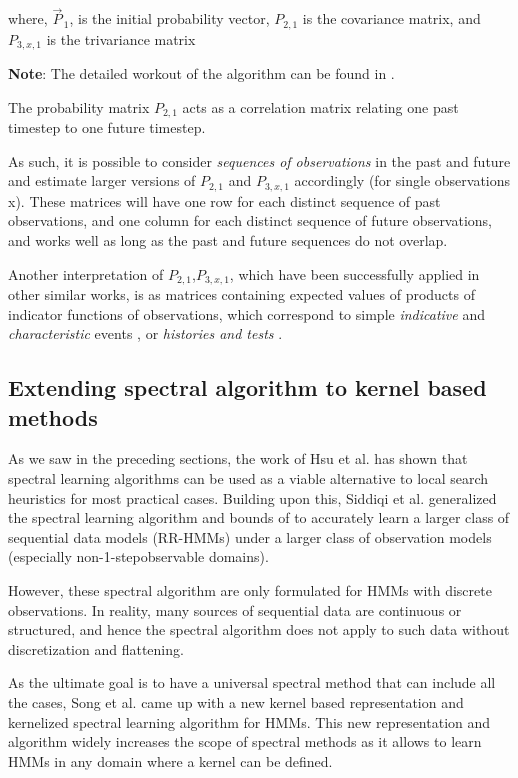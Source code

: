 where, ${\vec{P}_{\,1}}$, is the initial probability vector,
$ {P}_{2,1} $ is the covariance matrix, and
$ {P}_{3,x,1} $ is the trivariance matrix

\textbf{Note}: The detailed workout of the algorithm can be found in \cite{ref7}.


The probability matrix $ {P}_{2,1} $  acts as a correlation matrix relating one past timestep to one future timestep.

As such, it is possible to consider \textit{sequences of
observations} in the past and future and estimate larger
versions of $ {P}_{2,1} $  and $ {P}_{3,x,1} $  accordingly (for single observations
x). These matrices will have one row for each
distinct sequence of past observations, and one column
for each distinct sequence of future observations, and works well as long as the past and future sequences do not overlap.


Another interpretation of $ {P}_{2,1} $,$ {P}_{3,x,1} $, which have been successfully applied in other similar works, is as matrices containing expected values of products of indicator functions of observations, which correspond to simple \textit{indicative} and \textit{characteristic} events \cite{ref9},
or \textit{histories and tests} \cite{ref10}.


\subsection{Extending spectral algorithm to kernel based methods}

As we saw in the preceding sections, the work of Hsu et al.\cite{ref2} has shown that spectral learning algorithms can be used as a viable alternative to local search heuristics for most practical cases. Building upon this, Siddiqi et al.\cite{ref7} generalized the spectral learning algorithm
and bounds of \cite{ref2} to accurately learn
a larger class of sequential data models (RR-HMMs)
under a larger class of observation models (especially non-1-stepobservable domains).


However, these spectral algorithm are only formulated
for HMMs with discrete observations.
In reality, many sources of sequential data are continuous or structured, and hence the spectral algorithm does not apply to such data without discretization and flattening.

As the ultimate goal is to have a universal spectral method that can include all the cases, Song et al.\cite{ref20} came up with a new kernel based
representation and kernelized spectral learning
algorithm for HMMs. This new representation and algorithm widely increases the scope of spectral methods as it allows to learn HMMs in any domain where a kernel can be defined. 


